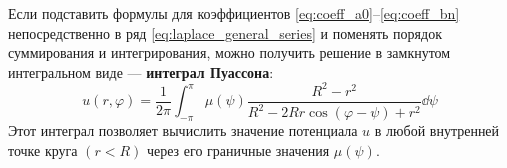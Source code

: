 	\begin{nb}
		Если подставить формулы для коэффициентов \eqref{eq:coeff_a0}--\eqref{eq:coeff_bn} непосредственно в ряд \eqref{eq:laplace_general_series} и поменять порядок суммирования и интегрирования, можно получить решение в замкнутом интегральном виде --- \textbf{интеграл Пуассона}:
		\begin{equation} \label{eq:poisson_integral}
			u(r,\varphi) = \frac{1}{2\pi} \int_{-\pi}^{\pi} \mu(\psi) \frac{R^2 - r^2}{R^2 - 2Rr\cos(\varphi - \psi) + r^2} \dd{\psi}
		\end{equation}
		Этот интеграл позволяет вычислить значение потенциала $u$ в любой внутренней точке круга $(r < R)$ через его граничные значения $\mu(\psi)$.
	\end{nb}
	
